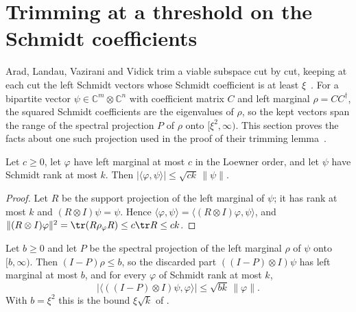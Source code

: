 \section{Trimming at a threshold on the Schmidt coefficients}

Arad, Landau, Vazirani and Vidick trim a viable subspace cut by cut, keeping
at each cut the left Schmidt vectors whose Schmidt coefficient is at least
$\xi$~\cite[lines 642--656]{Arad2016RigorousRG}. For a bipartite vector
$\psi\in\mathbb C^m\otimes\mathbb C^n$ with coefficient matrix $C$ and left
marginal $\rho=CC^\dagger$, the squared Schmidt coefficients are the
eigenvalues of $\rho$, so the kept vectors span the range of the spectral
projection $P$ of $\rho$ onto $[\xi^2,\infty)$. This section proves the facts
about one such projection used in the proof of their trimming
lemma~\cite[lines 660--697]{Arad2016RigorousRG}.

\begin{theorem}
    \label{thm:schmidt_threshold_pairing}
    \leanok
    Let $c\ge0$, let $\varphi$ have left marginal at most $c$ in the Loewner
    order, and let $\psi$ have Schmidt rank at most $k$. Then
    $|\langle\varphi,\psi\rangle|\le\sqrt{ck}\,\|\psi\|$.
\end{theorem}

\begin{proof}
    \leanok
    Let $R$ be the support projection of the left marginal of $\psi$; it has
    rank at most $k$ and $(R\otimes I)\psi=\psi$. Hence
    $\langle\varphi,\psi\rangle=\langle(R\otimes I)\varphi,\psi\rangle$, and
    $\|(R\otimes I)\varphi\|^2=\tr(R\rho_\varphi R)\le c\tr R\le ck$.
\end{proof}

\begin{theorem}
    \label{thm:schmidt_threshold_discarded}
    \leanok
    Let $b\ge0$ and let $P$ be the spectral projection of the left marginal
    $\rho$ of $\psi$ onto $[b,\infty)$. Then $(I-P)\rho\le b$, so the
    discarded part $((I-P)\otimes I)\psi$ has left marginal at most $b$, and
    for every $\varphi$ of Schmidt rank at most $k$,
    \[
        |\langle((I-P)\otimes I)\psi,\varphi\rangle|\le\sqrt{bk}\,\|\varphi\|.
    \]
    With $b=\xi^2$ this is the bound $\xi\sqrt k$ of
    \cite[lines 666--680]{Arad2016RigorousRG}.
\end{theorem}

